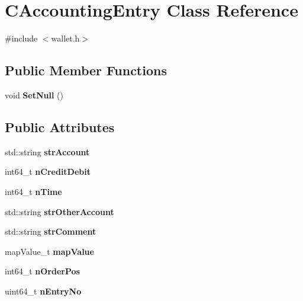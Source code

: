 \hypertarget{class_c_accounting_entry}{}\section{C\+Accounting\+Entry Class Reference}
\label{class_c_accounting_entry}


{\ttfamily \#include $<$wallet.\+h$>$}

\subsection*{Public Member Functions}
\begin{DoxyCompactItemize}
\item 
\mbox{\label{class_c_accounting_entry_a439b044226a1e465032ce4c4580d3389}} 
void {\bfseries Set\+Null} ()
\end{DoxyCompactItemize}
\subsection*{Public Attributes}
\begin{DoxyCompactItemize}
\item 
\mbox{\label{class_c_accounting_entry_a01434c1b0edad576bc1584c9b667ce1d}} 
std\+::string {\bfseries str\+Account}
\item 
\mbox{\label{class_c_accounting_entry_abb080aaba00c27e0414904fb956aad2b}} 
int64\+\_\+t {\bfseries n\+Credit\+Debit}
\item 
\mbox{\label{class_c_accounting_entry_a416a4eb8d47e4c4cfdfc366d9d777ae6}} 
int64\+\_\+t {\bfseries n\+Time}
\item 
\mbox{\label{class_c_accounting_entry_a6856c75221e9df5b6a99dda88f45d911}} 
std\+::string {\bfseries str\+Other\+Account}
\item 
\mbox{\label{class_c_accounting_entry_a80c42068f19b13e3201926d340fd10e9}} 
std\+::string {\bfseries str\+Comment}
\item 
\mbox{\label{class_c_accounting_entry_a5e3f28cdc5d1fb25472c49c482613fcb}} 
map\+Value\+\_\+t {\bfseries map\+Value}
\item 
\mbox{\label{class_c_accounting_entry_a9c5f78f13a657c1f1fc860a70ef072d5}} 
int64\+\_\+t {\bfseries n\+Order\+Pos}
\item 
\mbox{\label{class_c_accounting_entry_a0c35da8adbbc529238af70964e0d2b29}} 
uint64\+\_\+t {\bfseries n\+Entry\+No}
\end{DoxyCompactItemize}



